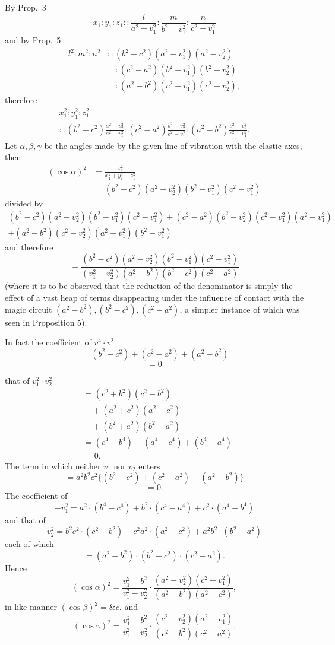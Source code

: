 \documentclass[11pt]{article}
\newcommand{\sourcepage}[1]{\marginpar{\scriptsize p.~#1}}
\begin{document}
By Prop.~3
\[
 x_1:y_1:z_1::\frac{l}{a^2-v_1^2}:\frac{m}{b^2-v_1^2}:\frac{n}{c^2-v_1^2}
\]
and by Prop.~5
\begin{align*}
 l^2:m^2:n^2&::(b^2-c^2)(a^2-v_1^2)(a^2-v_2^2)\\
&\quad:(c^2-a^2)(b^2-v_1^2)(b^2-v_2^2)\\
&\quad:(a^2-b^2)(c^2-v_1^2)(c^2-v_2^2);
\end{align*}
therefore
\begin{multline*}
 x_1^2:y_1^2:z_1^2\\
::(b^2-c^2)\frac{a^2-v_2^2}{a^2-v_1^2}:
(c^2-a^2)\frac{b^2-v_2^2}{b^2-v_1^2}:
(a^2-b^2)\frac{c^2-v_2^2}{c^2-v_1^2}.
\end{multline*}
Let $\alpha,\beta,\gamma$ be the angles made by the given line of vibration with the elastic axes, then
\begin{align*}
(\cos\alpha)^2&=\frac{x_1^2}{x_1^2+y_1^2+z_1^2}\\
&=(b^2-c^2)(a^2-v_2^2)(b^2-v_1^2)(c^2-v_1^2)
\end{align*}
divided by
\begin{multline*}
(b^2-c^2)(a^2-v_2^2)(b^2-v_1^2)(c^2-v_1^2)
+(c^2-a^2)(b^2-v_2^2)(c^2-v_1^2)(a^2-v_1^2)\\
+(a^2-b^2)(c^2-v_2^2)(a^2-v_1^2)(b^2-v_1^2)
\end{multline*}
and therefore
\[
=\frac{(b^2-c^2)(a^2-v_2^2)(b^2-v_1^2)(c^2-v_1^2)}{(v_1^2-v_2^2)(a^2-b^2)(b^2-c^2)(c^2-a^2)}
\]
(where it is to be observed that the reduction of the denominator is simply the effect of a vast heap of terms disappearing under the influence of contact with the magic circuit $(a^2-b^2),(b^2-c^2),(c^2-a^2)$, a simpler instance of which was seen in Proposition 5).

In fact the coefficient of $v^4\cdot v^2$
\[
 =(b^2-c^2)+(c^2-a^2)+(a^2-b^2)
\]
\[
=0
\]

\sourcepage{11}
that of $v_1^2\cdot v_2^2$
\begin{align*}
&=(c^2+b^2)(c^2-b^2)\\
&\quad+(a^2+c^2)(a^2-c^2)\\
&\quad+(b^2+a^2)(b^2-a^2)\\
&=(c^4-b^4)+(a^4-c^4)+(b^4-a^4)\\
&=0.
\end{align*}
The term in which neither $v_1$ nor $v_2$ enters
\[
=a^2b^2c^2\{(b^2-c^2)+(c^2-a^2)+(a^2-b^2)\}
\]
\[
=0.
\]
The coefficient of
\[
 -v_1^2=a^2\cdot(b^4-c^4)+b^2\cdot(c^4-a^4)+c^2\cdot(a^4-b^4)
\]
and that of
\[
 v_2^2=b^2c^2\cdot(c^2-b^2)+c^2a^2\cdot(a^2-c^2)+a^2b^2\cdot(b^2-a^2)
\]
each of which
\[
=(a^2-b^2)\cdot(b^2-c^2)\cdot(c^2-a^2).
\]
Hence
\[
 (\cos\alpha)^2=\frac{v_1^2-b^2}{v_1^2-v_2^2}\cdot
\frac{(a^2-v_2^2)(c^2-v_1^2)}{(a^2-b^2)(a^2-c^2)},
\]
in like manner $(\cos\beta)^2=\&c.$
and
\[
 (\cos\gamma)^2=\frac{v_1^2-b^2}{v_1^2-v_2^2}\cdot
\frac{(c^2-v_2^2)(a^2-v_1^2)}{(c^2-b^2)(c^2-a^2)}.
\]
\end{document}
